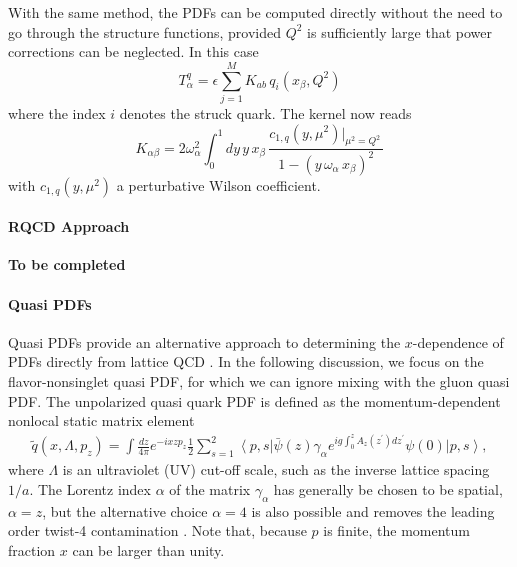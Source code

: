 With the same method, the PDFs can be computed directly without the need to go through the structure functions, provided $Q^2$ is
sufficiently large that power corrections can be neglected. In this case
\begin{equation}
T_\alpha^q = \epsilon \sum_{j=1}^M K_{ab}\, q_i(x_\beta,Q^2) 
\end{equation}
where the index $i$ denotes the struck quark. The kernel now reads
\begin{equation}
K_{\alpha\beta} =2 \omega_\alpha^2 \int_0^1 dy\,y\,x_\beta\, \frac{c_{1,q}(y,\mu^2)|_{\mu^2=Q^2}\, }{1-(y\,\omega_\alpha\, x_\beta)^2}
\end{equation}
with $c_{1,q}(y,\mu^2)$ a perturbative Wilson coefficient.

\paragraph{RQCD Approach}

{\bf To be completed}


%

\paragraph{Quasi PDFs}
Quasi PDFs provide an alternative approach to determining the $x$-dependence of PDFs directly from lattice QCD \cite{Ji:2013dva,Ji:2014gla}. In the following discussion, we focus on the flavor-nonsinglet quasi PDF, for which we can ignore mixing with the gluon quasi PDF. The unpolarized quasi quark PDF is defined as the momentum-dependent
nonlocal static matrix element
\begin{align}\label{eq:qPDF}
\widetilde{q}(x,\Lambda,p_z)  = \int \frac{dz}{4\pi} e^{-i x z p_z} 
\frac{1}{2}\sum_{s=1}^2\left\langle p,s\right\vert \bar{\psi}(z)\gamma_\alpha e^{ig\int_0^z
A_z(z^\prime) dz^\prime} \psi(0) \left\vert p,s\right\rangle ,
\end{align}
where $\Lambda$ is an ultraviolet (UV) cut-off scale, such as the inverse lattice spacing $1/a$. The Lorentz index $\alpha$ of the matrix $\gamma_\alpha$ has generally be chosen to be spatial, $\alpha = z$, but the alternative choice $\alpha = 4$ is also possible and removes the leading order twist-4 contamination \cite{Radyushkin:2016hsy}. Note that, because $p$ is finite, the momentum fraction $x$ can be larger than unity.

